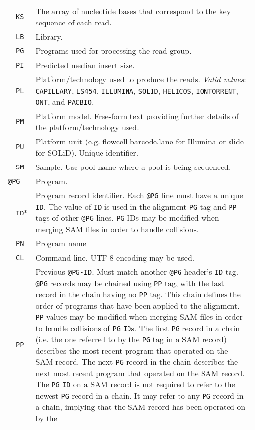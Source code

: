 \documentclass[10pt]{article}
\begin{document}
\begin{center}
\begin{longtable}{|l|l|p{13.5cm}|}
  & {\tt KS} & The array of nucleotide bases that correspond to the key sequence of each read.\\\cline{2-3}
  & {\tt LB} & Library.\\\cline{2-3}
  & {\tt PG} & Programs used for processing the read group.\\\cline{2-3}
  & {\tt PI} & Predicted median insert size.\\\cline{2-3}
  & {\tt PL} & Platform/technology used to produce the reads. \emph{Valid values}:
  {\tt CAPILLARY}, {\tt LS454}, {\tt ILLUMINA}, {\tt SOLID}, {\tt HELICOS}, {\tt IONTORRENT}, {\tt ONT}, and {\tt PACBIO}.\\\cline{2-3}
  & {\tt PM} & Platform model. Free-form text providing further details of the
  platform/technology used.\\\cline{2-3}
  & {\tt PU} & Platform unit (e.g. flowcell-barcode.lane for Illumina or slide for SOLiD). Unique identifier.\\\cline{2-3}
  & {\tt SM} & Sample. Use pool name where a pool is being sequenced.\\\cline{1-3}
  \multicolumn{2}{|l}{\tt @PG} & Program. \\\cline{2-3}
  & {\tt ID}* & Program record identifier. Each {\tt @PG} line must have a unique {\tt ID}.
  	The value of {\tt ID} is used in the alignment {\tt PG} tag and {\tt PP} tags of other {\tt @PG} lines.
	{\tt PG} IDs may be modified when merging SAM files in order to handle collisions.\\\cline{2-3}
  & {\tt PN} & Program name \\\cline{2-3}
  & {\tt CL} & Command line.  UTF-8 encoding may be used. \\\cline{2-3}
  & {\tt PP} & Previous {\tt @PG-ID}. Must match another {\tt @PG} header's {\tt ID} tag.
  	{\tt @PG} records may be chained using {\tt PP} tag, with the last record in the chain
	having no {\tt PP} tag. This chain defines the order of programs that have been applied to the alignment.
	{\tt PP} values may be modified when merging SAM files in order to handle collisions of {\tt PG} {\tt ID}s.
	The first {\tt PG} record in a chain (i.e. the one referred to by the {\tt PG} tag in a SAM record)
	describes the most recent program that operated on the SAM record.
	The next {\tt PG} record in the chain describes the next most recent program that
        operated on the SAM record. The {\tt PG} {\tt ID} on a SAM record is not required
        to refer to the newest {\tt PG} record in a chain.  It may refer to any {\tt PG}
        record in a chain, implying that the SAM record has been operated on by the

\end{longtable}
\end{center}
\end{document}
